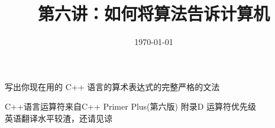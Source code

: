 \documentclass[11pt, a4paper, UTF8]{ctexart}
\title{第六讲：如何将算法告诉计算机}
\date{\today}     %
\begin{document}
\maketitle
\noplagiarism	%
\beginthishw	%

\begin{problem}	%
写出你现在用的 C++ 语言的算术表达式的完整严格的文法
 \end{problem}

\begin{remark}
C++语言运算符来自C++ Primer Plus(第六版) 附录D 运算符优先级\\
英语翻译水平较渣，还请见谅\\
\end{remark}
\end{document}
